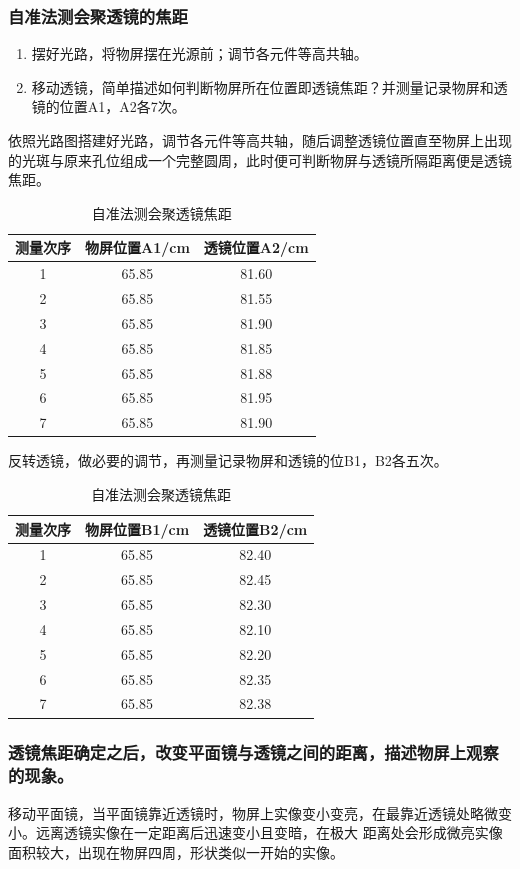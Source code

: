 \documentclass[dvipsnames, svgnames,a4paper,11pt]{article}
\begin{document}
\subsubsection{自准法测会聚透镜的焦距}
\begin{enumerate}
	\item 摆好光路，将物屏摆在光源前；调节各元件等高共轴。
	\item 移动透镜，简单描述如何判断物屏所在位置即透镜焦距？并测量记录物屏和透镜的位置A1，A2各7次。
\end{enumerate}
依照光路图搭建好光路，调节各元件等高共轴，随后调整透镜位置直至物屏上出现的光斑与原来孔位组成一个完整圆周，此时便可判断物屏与透镜所隔距离便是透镜焦距。
\begin{table}[H]
	\centering
	\caption{自准法测会聚透镜焦距}
	\begin{tabular}{ccc}
		\toprule
		测量次序&物屏位置A1/cm&透镜位置A2/cm\\
		\midrule
		1&65.85&81.60\\
		2&65.85&81.55\\
		3&65.85&81.90\\
		4&65.85&81.85\\
		5&65.85&81.88\\
		6&65.85&81.95\\
		7&65.85&81.90\\
		\toprule
	\end{tabular}
\end{table}
反转透镜，做必要的调节，再测量记录物屏和透镜的位B1，B2各五次。
\begin{table}[H]
	\centering
	\caption{自准法测会聚透镜焦距}
	\begin{tabular}{ccc}
		\toprule
		测量次序&物屏位置B1/cm&透镜位置B2/cm\\
		\midrule
		1&65.85&82.40\\
		2&65.85&82.45\\
		3&65.85&82.30\\
		4&65.85&82.10\\
		5&65.85&82.20\\
		6&65.85&82.35\\
		7&65.85&82.38\\
		\toprule
	\end{tabular}
\end{table}
\subsubsection{透镜焦距确定之后，改变平面镜与透镜之间的距离，描述物屏上观察的现象。}
移动平面镜，当平面镜靠近透镜时，物屏上实像变小变亮，在最靠近透镜处略微变小。远离透镜实像在一定距离后迅速变小且变暗，在极大
距离处会形成微亮实像面积较大，出现在物屏四周，形状类似一开始的实像。
\end{document}
